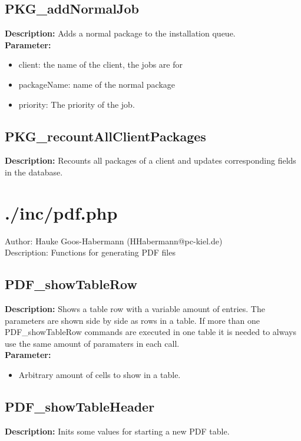 \subsection{PKG\_addNormalJob}
\textbf{Description:} Adds a normal package to the installation queue.\\
\textbf{Parameter:}
\begin{itemize}
\item client: the name of the client, the jobs are for
\item packageName: name of the normal package
\item priority: The priority of the job.
\end{itemize}

\subsection{PKG\_recountAllClientPackages}
\textbf{Description:} Recounts all packages of a client and updates corresponding fields in the database.\\

\newpage\section{./inc/pdf.php}
 Author: Hauke Goos-Habermann (HHabermann@pc-kiel.de)\\
 Description: Functions for generating PDF files\\

\subsection{PDF\_showTableRow}
\textbf{Description:} Shows a table row with a variable amount of entries. The parameters are shown side by side as rows in a table. If more than one PDF\_showTableRow commands are executed in one table it is needed to always use the same amount of paramaters in each call.\\
\textbf{Parameter:}
\begin{itemize}
\item Arbitrary amount of cells to show in a table.
\end{itemize}

\subsection{PDF\_showTableHeader}
\textbf{Description:} Inits some values for starting a new PDF table.\\

